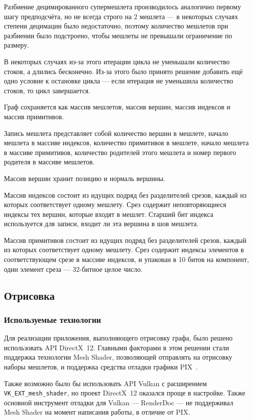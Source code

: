 Разбиение децимированного супермешлета производилось аналогично первому шагу предподсчёта, но не всегда строго на 2 мешлета --- в некоторых случаях степени децимации было недостаточно, поэтому количество мешлетов при разбиении было подстроено, чтобы мешлеты не превышали ограничение по размеру.

В некоторых случаях из-за этого итерации цикла не уменьшали количество стоков, а длились бесконечно.
Из-за этого было принято решение добавить ещё одно условие к остановке цикла --- если итерация не уменьшила количество стоков, то цикл завершается.

Граф сохраняется как массив мешлетов, массив вершин, массив индексов и массив примитивов.

Запись мешлета представляет собой количество вершин в мешлете, начало мешлета в массиве индексов, количество примитивов в мешлете, начало мешлета в массиве примитивов, количество родителей этого мешлета и номер первого родителя в массиве мешлетов.

Массив вершин хранит позицию и нормаль вершины.

Массив индексов состоит из идущих подряд без разделителей срезов, каждый из которых соответствует одному мешлету.
Срез содержит неповторяющиеся индексы тех вершин, которые входят в мешлет.
Старший бит индекса используется для записи, входит ли эта вершина в шов мешлета.

Массив примитивов состоит из идущих подряд без разделителей срезов, каждый из которых соответствует одному мешлету.
Срез содержит индексы элементов в соответствующем срезе в массиве индексов, и упакован в 10 битов на компонент, один элемент среза --- 32-битное целое число.

\subsection*{Отрисовка}
\subsubsection*{Используемые технологии}
Для реализации приложения, выполняющего отрисовку графа, было решено использовать API DirectX~12.
Главными факторами в этом решении стали поддержка технологии Mesh Shader, позволяющей отправлять на отрисовку наборы мешлетов, и поддержка средства отладки графики PIX~\cite{PIX}.

Также возможно было бы использовать API Vulkan с расширением \\
\texttt{VK\_EXT\_mesh\_shader}, но проект DirectX~12 оказался проще в настройке.
Также основной инструмент отладки для Vulkan --- RenderDoc --- не поддерживал Mesh Shader на момент написания работы, в отличие от PIX.


